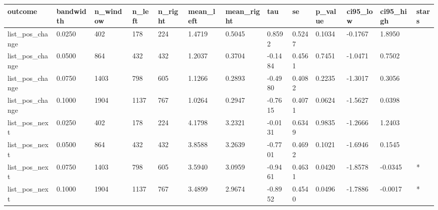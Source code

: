 \begin{tabular}{lllllllllllll}
\toprule
outcome & bandwidth & n\_window & n\_left & n\_right & mean\_left & mean\_right & tau & se & p\_value & ci95\_low & ci95\_high & stars \\
\midrule
list\_pos\_change & 0.0250 & 402 & 178 & 224 & 1.4719 & 0.5045 & 0.8592 & 0.5247 & 0.1034 & -0.1767 & 1.8950 &  \\
list\_pos\_change & 0.0500 & 864 & 432 & 432 & 1.2037 & 0.3704 & -0.1484 & 0.4561 & 0.7451 & -1.0471 & 0.7502 &  \\
list\_pos\_change & 0.0750 & 1403 & 798 & 605 & 1.1266 & 0.2893 & -0.4980 & 0.4082 & 0.2235 & -1.3017 & 0.3056 &  \\
list\_pos\_change & 0.1000 & 1904 & 1137 & 767 & 1.0264 & 0.2947 & -0.7615 & 0.4071 & 0.0624 & -1.5627 & 0.0398 &  \\
list\_pos\_next & 0.0250 & 402 & 178 & 224 & 4.1798 & 3.2321 & -0.0131 & 0.6349 & 0.9835 & -1.2666 & 1.2403 &  \\
list\_pos\_next & 0.0500 & 864 & 432 & 432 & 3.8588 & 3.2639 & -0.7701 & 0.4692 & 0.1021 & -1.6946 & 0.1545 &  \\
list\_pos\_next & 0.0750 & 1403 & 798 & 605 & 3.5940 & 3.0959 & -0.9461 & 0.4631 & 0.0420 & -1.8578 & -0.0345 & * \\
list\_pos\_next & 0.1000 & 1904 & 1137 & 767 & 3.4899 & 2.9674 & -0.8952 & 0.4540 & 0.0496 & -1.7886 & -0.0017 & * \\
\bottomrule
\end{tabular}
